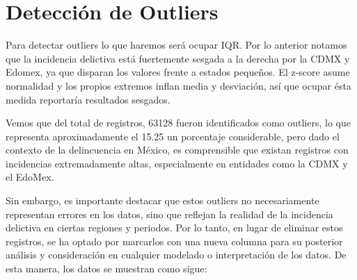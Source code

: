 \section{Detección de Outliers}

Para detectar outliers lo que haremos será ocupar IQR. Por lo anterior notamos que la incidencia delictiva está fuertemente
sesgada a la derecha por la CDMX y Edomex, ya que disparan los valores frente a estados pequeños. El z-score asume normalidad
y los propios extremos inflan media y desviación, así que ocupar ésta medida reportaría resultados sesgados.


Vemos que del total de registros, 63128 fueron identificados como outliers, lo que representa aproximadamente el 15.25%
un porcentaje considerable, pero dado el contexto de la delincuencia en México, es comprensible que existan registros con incidencias
extremadamente altas, especialmente en entidades como la CDMX y el EdoMex.

Sin embargo, es importante destacar que estos outliers no necesariamente representan errores en los datos, sino que reflejan la realidad de la
incidencia delictiva en ciertas regiones y periodos. Por lo tanto, en lugar de eliminar estos registros, se ha optado por marcarlos con una
nueva columna para su posterior análisis y consideración en cualquier modelado o interpretación de los datos. De esta manera, los datos se muestran
como sigue: